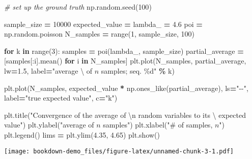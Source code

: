 \documentclass[
]{book}
\newenvironment{Shaded}{\begin{snugshade}}{\end{snugshade}}
\newcommand{\BuiltInTok}[1]{#1}
\newcommand{\CharTok}[1]{\textcolor[rgb]{0.31,0.60,0.02}{#1}}
\newcommand{\CommentTok}[1]{\textcolor[rgb]{0.56,0.35,0.01}{\textit{#1}}}
\newcommand{\ControlFlowTok}[1]{\textcolor[rgb]{0.13,0.29,0.53}{\textbf{#1}}}
\newcommand{\DecValTok}[1]{\textcolor[rgb]{0.00,0.00,0.81}{#1}}
\newcommand{\FloatTok}[1]{\textcolor[rgb]{0.00,0.00,0.81}{#1}}
\newcommand{\KeywordTok}[1]{\textcolor[rgb]{0.13,0.29,0.53}{\textbf{#1}}}
\newcommand{\NormalTok}[1]{#1}
\newcommand{\OperatorTok}[1]{\textcolor[rgb]{0.81,0.36,0.00}{\textbf{#1}}}
\newcommand{\SpecialCharTok}[1]{\textcolor[rgb]{0.00,0.00,0.00}{#1}}
\newcommand{\StringTok}[1]{\textcolor[rgb]{0.31,0.60,0.02}{#1}}
\theoremstyle{definition}
\theoremstyle{definition}
\theoremstyle{definition}
\theoremstyle{remark}
\begin{document}
\begin{Shaded}
\begin{Highlighting}[]
\CommentTok{\# set up the ground truth}
\NormalTok{np.random.seed(}\DecValTok{100}\NormalTok{)}

\NormalTok{sample\_size }\OperatorTok{=} \DecValTok{10000}
\NormalTok{expected\_value }\OperatorTok{=}\NormalTok{ lambda\_ }\OperatorTok{=} \FloatTok{4.6}
\NormalTok{poi }\OperatorTok{=}\NormalTok{ np.random.poisson}
\NormalTok{N\_samples }\OperatorTok{=} \BuiltInTok{range}\NormalTok{(}\DecValTok{1}\NormalTok{, sample\_size, }\DecValTok{100}\NormalTok{)}

\ControlFlowTok{for}\NormalTok{ k }\KeywordTok{in} \BuiltInTok{range}\NormalTok{(}\DecValTok{3}\NormalTok{):}
\NormalTok{    samples }\OperatorTok{=}\NormalTok{ poi(lambda\_, sample\_size)}
\NormalTok{    partial\_average }\OperatorTok{=}\NormalTok{ [samples[:i].mean() }\ControlFlowTok{for}\NormalTok{ i }\KeywordTok{in}\NormalTok{ N\_samples]}
\NormalTok{    plt.plot(N\_samples, partial\_average, lw}\OperatorTok{=}\FloatTok{1.5}\NormalTok{, label}\OperatorTok{=}\StringTok{"average \textbackslash{}}
\StringTok{    of  $n$ samples; seq. }\SpecialCharTok{\%d}\StringTok{"} \OperatorTok{\%}\NormalTok{ k)}

\NormalTok{plt.plot(N\_samples, expected\_value }\OperatorTok{*}\NormalTok{ np.ones\_like(partial\_average),}
\NormalTok{         ls}\OperatorTok{=}\StringTok{"{-}{-}"}\NormalTok{, label}\OperatorTok{=}\StringTok{"true expected value"}\NormalTok{, c}\OperatorTok{=}\StringTok{"k"}\NormalTok{)}

\NormalTok{plt.title(}\StringTok{"Convergence of the average of }\CharTok{\textbackslash{}n}\StringTok{ random variables to its \textbackslash{}}
\StringTok{expected value"}\NormalTok{)}
\NormalTok{plt.ylabel(}\StringTok{"average of $n$ samples"}\NormalTok{)}
\NormalTok{plt.xlabel(}\StringTok{"\# of samples, $n$"}\NormalTok{)}
\NormalTok{plt.legend()}
\NormalTok{lims }\OperatorTok{=}\NormalTok{ plt.ylim(}\FloatTok{4.35}\NormalTok{, }\FloatTok{4.65}\NormalTok{)}
\NormalTok{plt.show()}
\end{Highlighting}
\end{Shaded}

\texttt{[image: bookdown-demo\_files/figure-latex/unnamed-chunk-3-1.pdf]}
\end{document}

